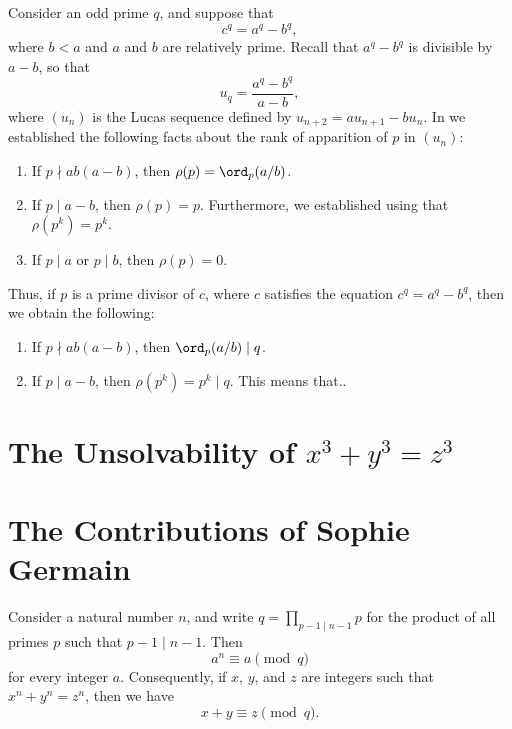 \begin{remark}
  Consider an odd prime $q$, and suppose that
  \begin{equation*}
    c^q =a^q-b^q,
  \end{equation*}
  where $b<a$ and $a$ and $b$ are relatively prime. Recall that $a^q-b^q$ is divisible by $a-b$, so that
  \begin{equation*}
    u_q=\frac{a^q-b^q}{a-b},
  \end{equation*}
  where $(u_n)$ is the Lucas sequence defined by $u_{n+2}=au_{n+1}-bu_n$. In  we established the following facts about the rank of apparition of $p$ in $(u_n)$:
  \begin{enumerate}
  \item If $p\nmid ab(a-b)$, then $\rho(p)=\ord_p(a/b)$.
  \item If $p\mid a-b$, then $\rho(p)=p$. Furthermore, we established using  that $\rho(p^k)=p^k$.
  \item If $p\mid a$ or $p\mid b$, then $\rho(p)=0$.
  \end{enumerate}
  Thus, if $p$ is a prime divisor of $c$, where $c$ satisfies the equation $c^q=a^q-b^q$, then we obtain the following:
  \begin{enumerate}
  \item If $p\nmid ab(a-b)$, then $\ord_p(a/b)\mid q$.
  \item If $p\mid a-b$, then $\rho(p^k)=p^k\mid q$. This means that..
  \end{enumerate}
\end{remark}

\section{The Unsolvability of \texorpdfstring{$x^3+y^3=z^3$}{x³+y³=z³}}

\section{The Contributions of Sophie Germain}

\begin{theorem}
  Consider a  natural number $n$, and write $q=\prod_{p-1\mid n-1}p$ for the product of all primes $p$ such that $p-1\mid n-1$. Then
  \begin{equation*}
    a^n\equiv a \pmod{q}
  \end{equation*}
  for every integer $a$. Consequently, if $x$, $y$, and $z$ are integers such that $x^n+y^n=z^n$, then we have
  \begin{equation*}
    x+y\equiv z\pmod{q}.
  \end{equation*}
\end{theorem}


